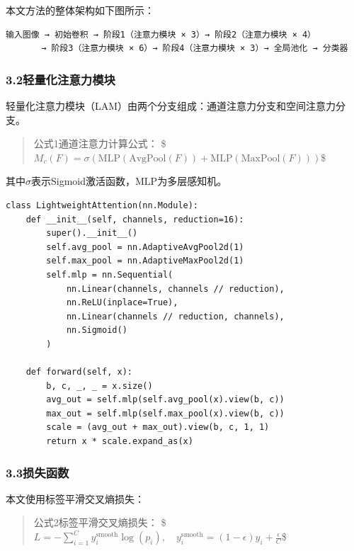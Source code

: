\documentclass{harryopo-paper}
\begin{document}
本文方法的整体架构如下图所示：

\begin{lstlisting}[style=plainstyle,caption={}]
输入图像 → 初始卷积 → 阶段1（注意力模块 × 3）→ 阶段2（注意力模块 × 4）
       → 阶段3（注意力模块 × 6）→ 阶段4（注意力模块 × 3）→ 全局池化 → 分类器
\end{lstlisting}

\subsubsection*{3.2轻量化注意力模块}

轻量化注意力模块（LAM）由两个分支组成：通道注意力分支和空间注意力分支。

\begin{quote}
{\fzht 公式1}通道注意力计算公式：
\$$M_c(F) = \sigma(\text{MLP}(\text{AvgPool}(F)) + \text{MLP}(\text{MaxPool}(F)))$\$
\end{quote}

其中$\sigma$表示Sigmoid激活函数，$\text{MLP}$为多层感知机。

\begin{lstlisting}[style=pystyle,caption={}]
class LightweightAttention(nn.Module):
    def __init__(self, channels, reduction=16):
        super().__init__()
        self.avg_pool = nn.AdaptiveAvgPool2d(1)
        self.max_pool = nn.AdaptiveMaxPool2d(1)
        self.mlp = nn.Sequential(
            nn.Linear(channels, channels // reduction),
            nn.ReLU(inplace=True),
            nn.Linear(channels // reduction, channels),
            nn.Sigmoid()
        )

    def forward(self, x):
        b, c, _, _ = x.size()
        avg_out = self.mlp(self.avg_pool(x).view(b, c))
        max_out = self.mlp(self.max_pool(x).view(b, c))
        scale = (avg_out + max_out).view(b, c, 1, 1)
        return x * scale.expand_as(x)
\end{lstlisting}

\subsubsection*{3.3损失函数}

本文使用标签平滑交叉熵损失：

\begin{quote}
{\fzht 公式2}标签平滑交叉熵损失：
\$$L = -\sum_{i=1}^{C} y_i^{\text{smooth}} \log(p_i), \quad y_i^{\text{smooth}} = (1-\epsilon) y_i + \frac{\epsilon}{C}$\$
\end{quote}
\end{document}
